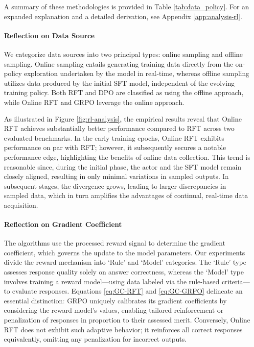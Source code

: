 {A summary of these methodologies is provided in Table \ref{tab:data_policy}. For an expanded explanation and a detailed derivation, see Appendix \ref{app:analysis-rl}.

\paragraph{Reflection on Data Source} We categorize data sources into two principal types: online sampling and offline sampling. Online sampling entails generating training data directly from the on-policy exploration undertaken by the model in real-time, whereas offline sampling utilizes data produced by the initial SFT model, independent of the evolving training policy. Both RFT and DPO are classified as using the offline approach, while Online RFT and GRPO leverage the online approach.

As illustrated in Figure \ref{fig:rl-analysis}, the empirical results reveal that Online RFT achieves substantially better performance compared to RFT across two evaluated benchmarks. In the early training epochs, Online RFT exhibits performance on par with RFT; however, it subsequently secures a notable performance edge, highlighting the benefits of online data collection. This trend is reasonable since, during the initial phase, the actor and the SFT model remain closely aligned, resulting in only minimal variations in sampled outputs. In subsequent stages, the divergence grows, leading to larger discrepancies in sampled data, which in turn amplifies the advantages of continual, real-time data acquisition.

\paragraph{Reflection on Gradient Coefficient} The algorithms use the processed reward signal to determine the gradient coefficient, which governs the update to the model parameters. Our experiments divide the reward mechanism into `Rule' and `Model' categories. The `Rule' type assesses response quality solely on answer correctness, whereas the `Model' type involves training a reward model—using data labeled via the rule-based criteria—to evaluate responses. Equations \ref{eq:GC-RFT} and \ref{eq:GC-GRPO} delineate an essential distinction: GRPO uniquely calibrates its gradient coefficients by considering the reward model’s values, enabling tailored reinforcement or penalization of responses in proportion to their assessed merit. Conversely, Online RFT does not exhibit such adaptive behavior; it reinforces all correct responses equivalently, omitting any penalization for incorrect outputs.

}
